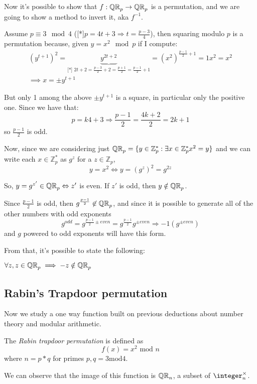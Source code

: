 Now it's possible to show that $f: \QR[p]\to \QR[p] $ is a permutation, and we are going to show a method to invert it, aka $f^{-1}$.

Assume $p\equiv 3 \mod{4}$ ([*]$p=4t+3\Rightarrow t=\frac{p-3}{4}$), then squaring modulo $p$ is a permutation because, given
\underline{$y=x^2 \mod{p}$} if I compute:
\begin{gather*}
    (y^{t+1})^2=\underbrace{y^{2t+2}}_{\text{[*]
    }2t+2=\frac{p-3}{2}+2=\frac{p+1}{2}=\frac{p-1}{2}+1}=(x^2)^{\frac{p-1}{2}+1}=1x^2=x^2\\
    \implies x=\pm y^{t+1}
\end{gather*}

But only 1 among the above $\pm y^{t+1}$ is a square, in particular only the positive one. Since we have that:
\[ 
    p=k4+3 \Rightarrow \frac{p-1}{2}=\frac{4k+2}{2}=2k+1
\]
so $\frac{p-1}{2}$ is odd.

Now, since we are considering just $\QR[p]=\{y \in \mathbb{Z}_{p}^{*} : \exists x \in \mathbb{Z}_{p}^{*} x^{2}=y\}$ and we can write each $x \in \mathbb{Z}_{p}^{*} $ as $g^{z}$ for a $z \in \mathbb{Z}_{p}$, 
\[
    y=x^{2} \Leftrightarrow y=(g^{z})^{2}=g^{2z}
\]

So, $y = g^{z'} \in \QR[p] \Leftrightarrow z'$ is even. If $z'$ is odd, then $y \notin \QR[p]$.

Since $\frac{p-1}{2}$ is odd, then $g^{\frac{p-1}{2}} \not\in \QR[p]$, and since it is possible to generate all of the other numbers with odd exponents 
\[
    g^{odd}=g^{\frac{p-1}{2} \pm even} = g^{\frac{p-1}{2}}g^{ \pm even} \Rightarrow -1(g^{\pm even})
\]
and $g$ powered to odd exponents will have this form.

From that, it's possible to state the following:
\begin{lemma}
    $\forall z, z\in \QR[p] \implies -z \notin \QR[p]$
\end{lemma}

\subsection{Rabin's Trapdoor permutation}

Now we study a one way function built on previous deductions about number theory and modular arithmetic.

The \textit{Rabin trapdoor permutation} is defined as 
\[
    f(x)=x^{2} \text{ mod } n
\]
where $n=p*q$ for primes $p, q = 3 \text{mod} 4$.

We can observe that the image of this function is $\QR[n]$, a subset of $\integer_n^\times$.

